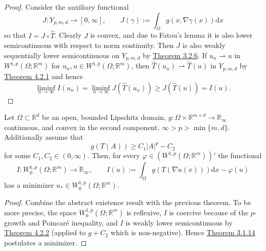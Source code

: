 \begin{proof}
Consider the auxiliary functional
\[J:Y_{p,m,d}\longrightarrow[0,\infty],\qquad J(\gamma):=\int_\Omega{g(x,\nabla\gamma(x))\mathrm{d}x}\]
so that $I=J\circ\widehat{T}$. Clearly $J$ is convex, and due to Fatou's lemma it is also lower semicontinuous with respect to norm continuity. Then $J$ is also weakly sequentially lower semicontinuous on $Y_{p,m,d}$ by \hyperlink{theorem_3_2_6}{Theorem 3.2.6}. If $u_n\rightharpoonup u$ in $W^{1,p}(\Omega;\mathbb{R}^m)$ for $u_n,u\in W^{1,p}(\Omega;\mathbb{R}^m)$, then $\widehat{T}(u_n)\rightharpoonup\widehat{T}(u)$ in $Y_{p,m,d}$ by \hyperlink{theorem_4_2_1}{Theorem 4.2.1} and hence
\[\liminf_{n\to\infty}{I(u_n)}=\liminf_{n\to\infty}{J(\widehat{T}(u_n))}\geq J(\widehat{T}(u))=I(u).\]
\end{proof}

\begin{theorem}
Let $\Omega\subset\mathbb{R}^d$ be an open, bounded Lipschitz domain, $g:\Omega\times\mathbb{R}^{m\times d}\longrightarrow\mathbb{R}_\infty$ continuous, and convex in the second component, $\infty>p>\min\{m,d\}$. Additionally assume that
\[g(T(A))\geq C_1\lvert A\rvert^p-C_2\]
for some $C_1,C_2\in(0,\infty)$. Then, for every $\varphi\in(W^{1,p}(\Omega;\mathbb{R}^m))'$ the functional
\[I:W_0^{1,p}(\Omega;\mathbb{R}^m)\longrightarrow\mathbb{R}_\infty,\qquad I(u):=\int_\Omega{g(T(\nabla u(x)))\mathrm{d}x}-\varphi(u)\]
has a minimizer $u_*\in W_0^{1,p}(\Omega;\mathbb{R}^m)$.\\
\end{theorem}
\begin{proof}
Combine the abstract existence result with the previous theorem. To be more precise, the space $W_0^{1,p}(\Omega;\mathbb{R}^m)$ is reflexive, $I$ is coercive because of the $p$-growth and Poincar\'e inequality, and $I$ is weakly lower semicontinuous by \hyperlink{theorem_4_2_2}{Theorem 4.2.2} (applied to $g+C_2$ which is non-negative). Hence \hyperlink{theorem_3_1_14}{Theorem 3.1.14} postulates a minimizer.
\end{proof}
